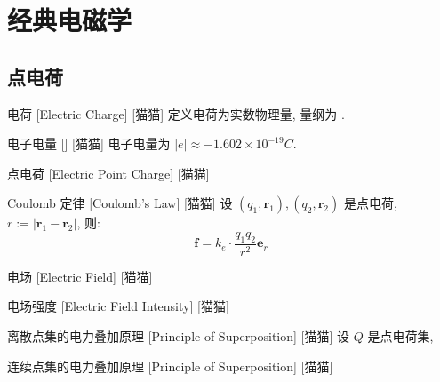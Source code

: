 \documentclass[UTF8]{ctexart}
\begin{document}
\tableofcontents
\newpage

\section{经典电磁学}

    \subsection{点电荷}

        \begin{dfn}
            {电荷}
            [Electric Charge]
            [猫猫]
            定义电荷为实数物理量, 量纲为 \(\). 
        \end{dfn}
        
        \begin{axm}
            []
            {电子电量}
            []
            [猫猫]
            电子电量为 \(|e|\approx-1.602 \times 10^{-19} C\).
        \end{axm}
        
        \begin{dfn}
            {点电荷}
            [Electric Point Charge]
            [猫猫]
        \end{dfn}
        
        \begin{axm}
            {Coulomb 定律}
            [Coulomb's Law]
            [猫猫]
            设 \((q_1, \bm{r}_1), (q_2, \bm{r}_2)\) 是点电荷, \(r:=|\bm{r}_1-\bm{r}_2|\), 则: 
            \[\bm{f}=k_e\cdot\frac{q_1 q_2}{r^2}\bm{e}_r\]
        \end{axm}
        
        \begin{dfn}
            {电场}
            [Electric Field]
            [猫猫]
        \end{dfn}
        
        \begin{dfn}
            {电场强度}
            [Electric Field Intensity]
            [猫猫]
        \end{dfn}
        
        \begin{thm}
            []
            {离散点集的电力叠加原理}
            [Principle of Superposition]
            [猫猫]
            设 \(Q\) 是点电荷集, 
        \end{thm}
        
        \begin{thm}
            []
            {连续点集的电力叠加原理}
            [Principle of Superposition]
            [猫猫]
        \end{thm}
\end{document}

